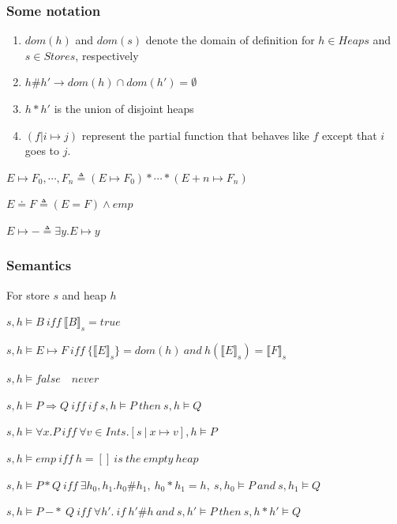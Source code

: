 \documentclass[professionalfont]{beamer}
\begin{document}
    \begin{frame}
        \frametitle{Some notation}
        \begin{enumerate}
            \item $dom(h)$ and $dom(s)$ denote the domain of definition
            for $h \in Heaps$ and $s \in Stores$, respectively
            \bigskip
            \item $h\#h' \rightarrow dom(h) \cap dom(h') = \emptyset$
            \bigskip
            \item $ h \ast h'$ is the union of disjoint heaps
            \bigskip
            \item $(f | i \mapsto j)$ represent the partial function that behaves like $f$ except that $i$ goes to $j$.
        \end{enumerate}

        \bigskip
        $E \mapsto F_0,\cdots,F_n \triangleq (E \mapsto F_0) \ast \cdots \ast (E+n \mapsto F_n)$
        
        \medskip
        $E \doteq F \triangleq (E=F) \wedge emp$

        \medskip
        $ E \mapsto - \triangleq \exists y.E\mapsto y$
    \end{frame}
    \begin{frame}
        \frametitle{Semantics}
        
        For store $s$ and heap $h$
        \scriptsize
        \begin{card}
        \pause
        $s,h \models B\ iff\ \llbracket B \rrbracket_s = true$
       

        \bigskip
        $s,h \models  E \mapsto F\ iff\ \{\llbracket E \rrbracket_s\} = dom(h)\ and\ h(\llbracket E \rrbracket_s)=\llbracket F \rrbracket_s$
        
        
        \bigskip
        $s,h \models false \quad never $
   
        
        \bigskip
        $s,h \models  P \Rightarrow Q\ iff\ if\ s,h \models P\ then\ s,h \models Q$
        
        
        \bigskip
        $s,h \models  \forall x.P\ iff\ \forall v \in Ints. [s\ |\ x \mapsto v ],h \models P $
        \pause
        
        \bigskip
        $s,h \models  emp\ iff\ h=[]\ is\ the\ empty\ heap $
      
        \bigskip
        $s,h \models  P \ast Q\ iff\ \exists h_0, h_1. h_0 \# h_1,\ h_0 \ast h_1 = h,\ s,h_0 \models P\ and\ s,h_1 \models Q $
        
        \bigskip
        $s,h \models  P\ {-*}\ Q\ iff\ \forall h'.\ if\ h'\#h\ and\ s,h' \models P\ then\ s,h\ast h' \models Q$
       
        
        \end{card}
    \end{frame}
\end{document}
